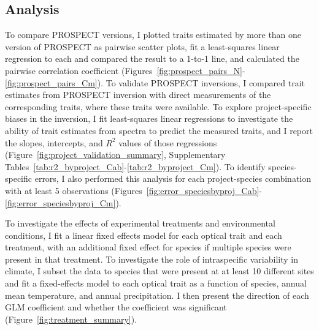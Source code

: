 \subsection{Analysis}

To compare PROSPECT versions, I plotted traits estimated by more than one version of PROSPECT as pairwise scatter plots, fit a least-squares linear regression to each and compared the result to a 1-to-1 line, and calculated the pairwise correlation coefficient (Figures~\ref{fig:prospect_pairs_N}-\ref{fig:prospect_pairs_Cm}).
% 
% 
To validate PROSPECT inversions, I compared trait estimates from PROSPECT inversion with direct measurements of the corresponding traits, where these traits were available.
% 
% 
To explore project-specific biases in the inversion, I fit least-squares linear regressions to investigate the ability of trait estimates from spectra to predict the measured traits, and I report the slopes, intercepts, and $R^2$ values of those regressions (Figure~\ref{fig:project_validation_summary}, Supplementary Tables~\ref{tab:r2_byproject_Cab}-\ref{tab:r2_byproject_Cm}).
To identify species-specific errors, I also performed this analysis for each project-species combination with at least 5 observations (Figures~\ref{fig:error_speciesbyproj_Cab}-\ref{fig:error_speciesbyproj_Cm}).

To investigate the effects of experimental treatments and environmental conditions, I fit a linear fixed effects model for each optical trait and each treatment, with an additional fixed effect for species if multiple species were present in that treatment.
To investigate the role of intraspecific variability in climate, I subset the data to species that were present at at least 10 different sites and fit a fixed-effects model to each optical trait as a function of species, annual mean temperature, and annual precipitation.
% 
% 
I then present the direction of each GLM coefficient and whether the coefficient was significant (Figure~\ref{fig:treatment_summary}).


